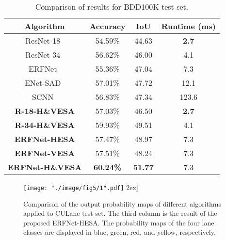 \documentclass[10pt,twocolumn,letterpaper]{article}
\begin{document}
\begin{table}[!t]
	\centering
	\footnotesize{
		\begin{tabular}{c|c|c|c}
			\hline
			Algorithm & Accuracy & IoU & Runtime (ms)\\
			\hline \hline
			ResNet-18~\cite{he2016deep} & 54.59\% & 44.63 & \textbf{2.7} \\
			ResNet-34~\cite{he2016deep} & 56.62\% & 46.00 & 4.1 \\
			ERFNet~\cite{romera2017erfnet} & 55.36\% & 47.04 & 7.3 \\
			ENet-SAD~\cite{hou2019learning} & 57.01\% & 47.72 & 12.1 \\
			SCNN~\cite{pan2017spatial} & 56.83\% & 47.34 & 123.6 \\
			\hline \hline
			\textbf{R-18-H\&VESA} & 57.03\% & 46.50 & \textbf{2.7} \\
			\textbf{R-34-H\&VESA} & 59.93\% & 49.51 & 4.1 \\
			\textbf{ERFNet-HESA} & 57.47\% & 48.97 & 7.3 \\
			\textbf{ERFNet-VESA} & 57.51\% & 48.24 & 7.3 \\
			\textbf{ERFNet-H\&VESA} & \textbf{60.24\%} & \textbf{51.77} & 7.3 \\
			\hline
		\end{tabular}
	}
	\caption{Comparison of results for BDD100K test set.}
	\label{table:three}
	\vspace{-2ex}
\end{table}

\begin{figure*}
	\setlength{\belowcaptionskip}{-10pt}
	\begin{center}
		\texttt{[image: "./image/fig5/1".pdf]}
		\-2ex]
		\caption{Comparison of the output probability maps of different algorithms applied to CULane test set. The third column is the result of the proposed ERFNet-HESA. The probability maps of the four lane classes are displayed in blue, green, red, and yellow, respectively.}
		\label{fig:culane}
	\end{center}
	\vspace{-2ex}
\end{figure*}
\end{document}
